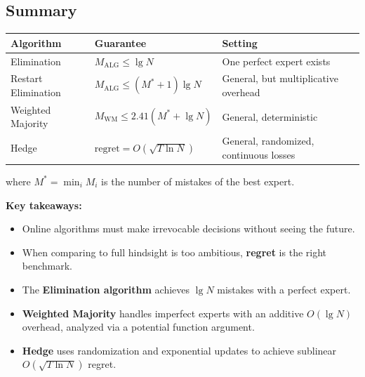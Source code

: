 \subsection{Summary}

\begin{center}
\begin{tabular}{p{3cm} p{4.5cm} p{5cm}}
\toprule
\textbf{Algorithm} & \textbf{Guarantee} & \textbf{Setting} \\
\midrule
Elimination & $M_{\mathrm{ALG}} \leq \lg N$ & One perfect expert exists \\
Restart Elimination & $M_{\mathrm{ALG}} \leq (M^*+1)\lg N$ & General, but multiplicative overhead \\
Weighted Majority & $M_{\mathrm{WM}} \leq 2.41(M^* + \lg N)$ & General, deterministic \\
Hedge & $\text{regret} = O(\sqrt{T\ln N})$ & General, randomized, continuous losses \\
\bottomrule
\end{tabular}
\end{center}

where $M^* = \min_i M_i$ is the number of mistakes of the best expert.

\textbf{Key takeaways:}
\begin{itemize}
  \item Online algorithms must make irrevocable decisions without seeing the future.
  \item When comparing to full hindsight is too ambitious, \textbf{regret} is the right benchmark.
  \item The \textbf{Elimination algorithm} achieves $\lg N$ mistakes with a perfect expert.
  \item \textbf{Weighted Majority} handles imperfect experts with an additive $O(\lg N)$ overhead, analyzed via a potential function argument.
  \item \textbf{Hedge} uses randomization and exponential updates to achieve sublinear $O(\sqrt{T \ln N})$ regret.
\end{itemize}